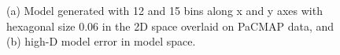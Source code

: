 \documentclass[
  12pt]{article}
\begin{document}
\begin{figure}[H]


\caption{\label{fig-nldervisMNISTPACMAP}(a) Model generated with 12 and
15 bins along x and y axes with hexagonal size 0.06 in the 2D space
overlaid on PaCMAP data, and (b) high-D model error in model space.}

\end{figure}%

\begin{figure}[H]

\begin{minipage}{0.33\linewidth}


\subcaption{\label{fig-mnist1-sc1}}

\end{minipage}%
%
\begin{minipage}{0.33\linewidth}

\centering{

}
\end{minipage}
\end{figure}
\end{document}
